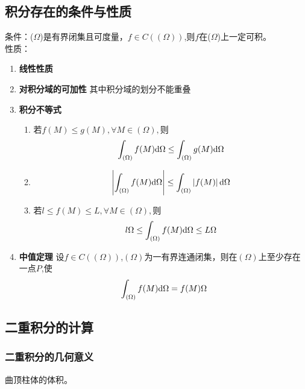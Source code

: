 \subsection{积分存在的条件与性质}
条件：($\Omega$)是有界闭集且可度量，$f \in C((\Omega))$,则$f$在($\Omega$)上一定可积。\\
性质：
\begin{enumerate}
	\item \textbf{线性性质}
	\item \textbf{对积分域的可加性} \quad 其中积分域的划分不能重叠
	\item \textbf{积分不等式}
	\begin{enumerate}
		\item $\text{若}f(M) \leq g(M),\forall M \in (\Omega),\text{则}$
		\begin{equation}
			\int_{(\Omega)}f(M)\mathrm{d} \Omega \leq \int_{(\Omega)} g(M)\mathrm{d}\Omega
		\end{equation}
		\item 
		\begin{equation}
			\left | \int_{(\Omega)}f(M)\mathrm{d} \Omega \right | \leq \int_{(\Omega)} \left | f(M) \right |\mathrm{d} \Omega 
		\end{equation}
		\item $\text{若}l\leq f(M) \leq L, \forall M \in (\Omega),\text{则}$
		\begin{equation}
			l\Omega\leq \int_{(\Omega)}f(M)\mathrm{d} \Omega \leq L\Omega
		\end{equation}
		
	\end{enumerate}
	
	\item \textbf{中值定理} \quad 设$f \in C((\Omega))$,$(\Omega)$为一有界连通闭集，则在$(\Omega)$上至少存在一点$P$,使
	\begin{equation}
		\int_{(\Omega)}f(M)\mathrm{d} \Omega=f(M)\Omega
	\end{equation}
\end{enumerate}
\subsection{二重积分的计算}
\subsubsection{二重积分的几何意义}
曲顶柱体的体积。
